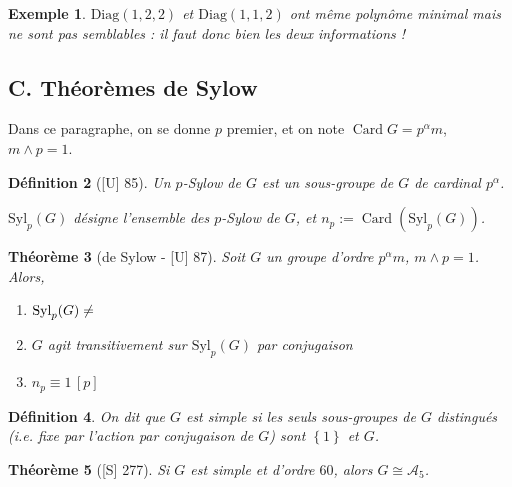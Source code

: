\documentclass[10pt, a4paper, parskip=full, twoside, twocolumn]{report}
\newtheorem{definition}{Définition}
\newtheorem{theorem}[definition]{Théorème}
\newtheorem{example}[definition]{Exemple}
\DeclareMathOperator{\card}{Card}
\begin{document}
\begin{example}
	$\text{Diag}(1,2,2)$ et $\text{Diag}(1,1,2)$ ont même polynôme minimal mais ne sont pas semblables : il faut donc bien les deux informations !
\end{example}

\subsection*{C. Théorèmes de Sylow}
Dans ce paragraphe, on se donne $p$ premier, et on note $\card G = p^{\alpha}m$, $m\wedge p = 1$.

\begin{definition}[\textnormal{[U] 85}]
	Un $p$-Sylow de $G$ est un sous-groupe de $G$ de cardinal $p^{\alpha}$.

	$\text{Syl}_p(G)$ désigne l'ensemble des $p$-Sylow de $G$, et $n_p := \card(\text{Syl}_p(G))$.
\end{definition}

\begin{theorem}[de Sylow - \textnormal{[U] 87}]Soit $G$ un groupe d'ordre $p^{\alpha}m$, $m\wedge p = 1$. Alors,
	\begin{enumerate}
		\item $\text{Syl}_p(G)\neq \empty$
		\item $G$ agit transitivement sur $\text{Syl}_p(G)$ par conjugaison
		\item $n_p\equiv 1\, [p]$
	\end{enumerate}
\end{theorem}

\begin{definition}
	On dit que $G$ est \emph{simple} si les seuls sous-groupes de $G$ distingués (\emph{i.e.} fixe par l'action par conjugaison de $G$)
	sont $\left\{1\right\}$ et $G$.
\end{definition}

\begin{tcolorbox}[
    breakable, %
    colback=developpement, %
    colframe=gray!0!black, %
    boxrule=0pt, %
    arc=1mm, %
	boxsep=0pt,
	left=0pt, right=0pt, top=0pt, bottom=0pt
]
\begin{theorem}[\textnormal{[S] 277}]\label{dev2}
	Si $G$ est simple et d'ordre $60$, alors 
	$G\cong \mathcal{A}_5$.
\end{theorem}
\end{tcolorbox}
\end{document}
